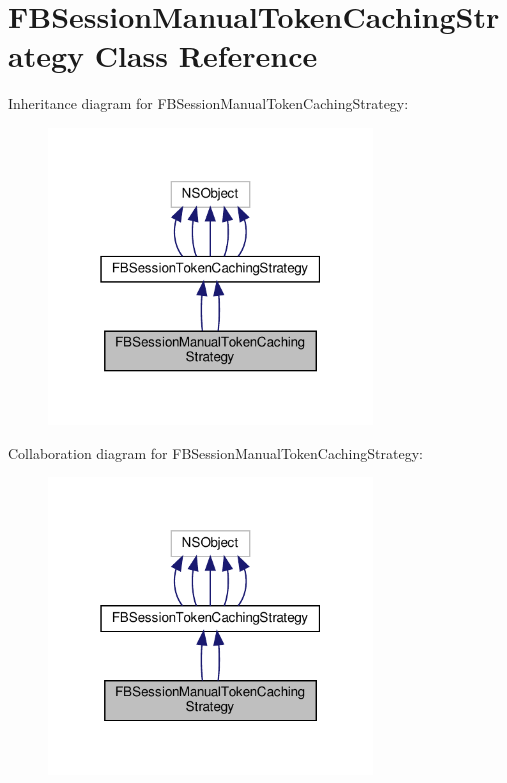 \hypertarget{interfaceFBSessionManualTokenCachingStrategy}{}\section{F\+B\+Session\+Manual\+Token\+Caching\+Strategy Class Reference}
\label{interfaceFBSessionManualTokenCachingStrategy}


Inheritance diagram for F\+B\+Session\+Manual\+Token\+Caching\+Strategy\+:
\nopagebreak
\begin{figure}[H]
\begin{center}
\leavevmode
\includegraphics[width=244pt]{interfaceFBSessionManualTokenCachingStrategy__inherit__graph}
\end{center}
\end{figure}


Collaboration diagram for F\+B\+Session\+Manual\+Token\+Caching\+Strategy\+:
\nopagebreak
\begin{figure}[H]
\begin{center}
\leavevmode
\includegraphics[width=244pt]{interfaceFBSessionManualTokenCachingStrategy__coll__graph}
\end{center}
\end{figure}
